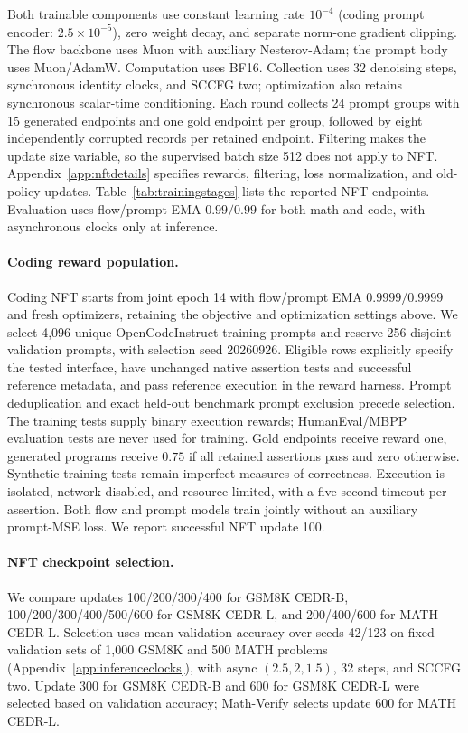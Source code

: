 \documentclass[11pt,letterpaper]{article}
\begin{document}
Both trainable components use constant learning rate $10^{-4}$ (coding prompt encoder: $2.5\times10^{-5}$), zero weight decay, and separate norm-one gradient clipping. The flow backbone uses Muon with auxiliary Nesterov-Adam; the prompt body uses Muon/AdamW. Computation uses BF16. Collection uses 32 denoising steps, synchronous identity clocks, and SCCFG two; optimization also retains synchronous scalar-time conditioning. Each round collects 24 prompt groups with 15 generated endpoints and one gold endpoint per group, followed by eight independently corrupted records per retained endpoint. Filtering makes the update size variable, so the supervised batch size 512 does not apply to NFT. Appendix~\ref{app:nftdetails} specifies rewards, filtering, loss normalization, and old-policy updates. Table~\ref{tab:trainingstages} lists the reported NFT endpoints. Evaluation uses flow/prompt EMA $0.99/0.99$ for both math and code, with asynchronous clocks only at inference.

\paragraph{Coding reward population.}
Coding NFT starts from joint epoch 14 with flow/prompt EMA $0.9999/0.9999$ and fresh optimizers, retaining the objective and optimization settings above. We select 4,096 unique OpenCodeInstruct training prompts and reserve 256 disjoint validation prompts, with selection seed 20260926. Eligible rows explicitly specify the tested interface, have unchanged native assertion tests and successful reference metadata, and pass reference execution in the reward harness. Prompt deduplication and exact held-out benchmark prompt exclusion precede selection. The training tests supply binary execution rewards; HumanEval/MBPP evaluation tests are never used for training. Gold endpoints receive reward one, generated programs receive $0.75$ if all retained assertions pass and zero otherwise. Synthetic training tests remain imperfect measures of correctness. Execution is isolated, network-disabled, and resource-limited, with a five-second timeout per assertion. Both flow and prompt models train jointly without an auxiliary prompt-MSE loss. We report successful NFT update 100.

\paragraph{NFT checkpoint selection.}
We compare updates 100/200/300/400 for GSM8K CEDR-B, 100/200/300/400/500/600 for GSM8K CEDR-L, and 200/400/600 for MATH CEDR-L. Selection uses mean validation accuracy over seeds 42/123 on fixed validation sets of 1,000 GSM8K and 500 MATH problems (Appendix~\ref{app:inferenceclocks}), with async $(2.5,2,1.5)$, 32 steps, and SCCFG two. Update 300 for GSM8K CEDR-B and 600 for GSM8K CEDR-L were selected based on validation accuracy; Math-Verify selects update 600 for MATH CEDR-L.
\end{document}
